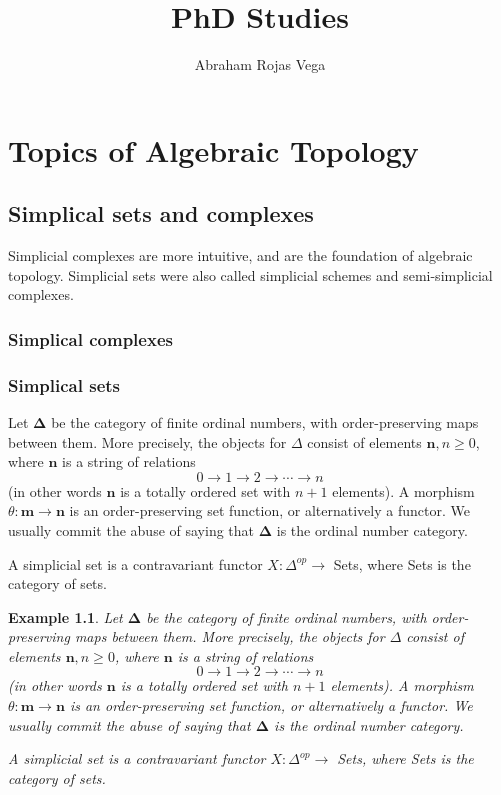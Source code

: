\documentclass{book}
\title{PhD Studies}
\author{Abraham Rojas Vega}
\newtheorem{example}{Example}
\begin{document}
\maketitle

\tableofcontents
\part*{Topics of Algebraic Topology}

\chapter{Simplical sets and complexes}

Simplicial complexes are more intuitive, and are the foundation of algebraic topology. Simplicial sets were also called simplicial schemes and semi-simplicial complexes. 

\section{Simplical complexes}



\section{Simplical sets}

Let $\mathbf{\Delta}$ be the category of finite ordinal numbers, with order-preserving maps between them. More precisely, the objects for $\Delta$ consist of elements $\mathbf{n}, n \geq 0$, where $\mathbf{n}$ is a string of relations
$$
0 \rightarrow 1 \rightarrow 2 \rightarrow \cdots \rightarrow n
$$
(in other words $\mathbf{n}$ is a totally ordered set with $n+1$ elements). A morphism $\theta: \mathbf{m} \rightarrow \mathbf{n}$ is an order-preserving set function, or alternatively a functor. We usually commit the abuse of saying that $\mathbf{\Delta}$ is the ordinal number category.

A simplicial set is a contravariant functor $X: \Delta^{o p} \rightarrow$ Sets, where Sets is the category of sets.

\begin{example}
    Let $\boldsymbol{\Delta}$ be the category of finite ordinal numbers, with order-preserving maps between them. More precisely, the objects for $\Delta$ consist of elements $\mathbf{n}, n \geq 0$, where $\mathbf{n}$ is a string of relations
$$
0 \rightarrow 1 \rightarrow 2 \rightarrow \cdots \rightarrow n
$$
(in other words $\mathbf{n}$ is a totally ordered set with $n+1$ elements). A morphism $\theta: \mathbf{m} \rightarrow \mathbf{n}$ is an order-preserving set function, or alternatively a functor. We usually commit the abuse of saying that $\boldsymbol{\Delta}$ is the ordinal number category.

A simplicial set is a contravariant functor $X: \Delta^{o p} \rightarrow$ Sets, where Sets is the category of sets.
\end{example}
\end{document}
